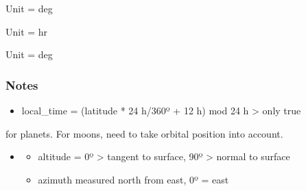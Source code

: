 \documentclass[letterpaper,10pt,english]{sphinxmanual}
\begin{document}
\begin{fulllineitems}
\begin{fulllineitems}
\begin{fulllineitems}

\pysigstartsignatures
\pysigline
{}
\pysigstopsignatures
\sphinxAtStartPar
Unit = deg

\end{fulllineitems}


\begin{fulllineitems}
\label{\detokenize{nexoclom2/nexoclom2.particle_tracking.starting_point:id1}}
\pysigstartsignatures
\pysigline
{}
\pysigstopsignatures
\sphinxAtStartPar
Unit = hr

\end{fulllineitems}



\begin{fulllineitems}

\pysigstartsignatures
\pysigline
{}
\pysigstopsignatures
\sphinxAtStartPar
Unit = deg

\end{fulllineitems}

\subsubsection*{Notes}
\begin{itemize}
\item {} 
\sphinxAtStartPar
local\_time = (latitude * 24 h/360º + 12 h) mod 24 h \sphinxhyphen{}\textgreater{} only true

\end{itemize}

\sphinxAtStartPar
for planets. For moons, need to take orbital position into account.
\begin{itemize}
\item {} \begin{description}
\begin{itemize}
\item {} 
\sphinxAtStartPar
altitude = 0º \sphinxhyphen{}\textgreater{} tangent to surface, 90º \sphinxhyphen{}\textgreater{} normal to surface

\item {} 
\sphinxAtStartPar
azimuth measured north from east, 0º = east


\end{itemize}
\end{description}
\end{itemize}
\end{fulllineitems}
\end{fulllineitems}
\end{document}
